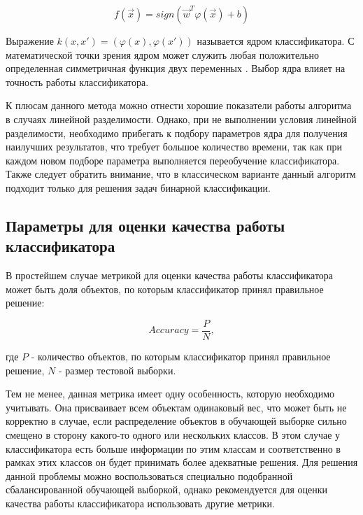 \begin{equation}
f(\vec x) = sign(\vec w^T \varphi(\vec x) + b)
\end{equation}

Выражение $k(x, x') = (\varphi(x),\varphi(x'))$ называется ядром классификатора. С математической точки зрения ядром может служить любая положительно определенная симметричная функция двух переменных \cite{Vorontsov-lections}.
Выбор ядра влияет на точность работы классификатора.

К плюсам данного метода можно отнести хорошие показатели работы алгоритма в случаях линейной разделимости. Однако, при не выполнении условия линейной разделимости, необходимо прибегать к подбору параметров ядра для получения наилучших результатов, что требует большое количество времени, так как при каждом новом подборе параметра выполняется переобучение классификатора. Также следует обратить внимание, что в классическом варианте данный алгоритм подходит только для решения задач бинарной классификации.


\subsection{Параметры для оценки качества работы классификатора}

В простейшем случае метрикой для оценки качества работы классификатора может быть доля объектов, по которым классификатор принял правильное решение:

\begin{equation}
Accuracy = \frac{P}{N},  
\end{equation}

\vspace{\baselineskip}
где $P$ - количество объектов, по которым классификатор принял правильное решение, $N$ - размер тестовой выборки.

Тем не менее, данная метрика имеет одну особенность, которую необходимо учитывать. Она присваивает всем объектам одинаковый вес, что может быть не корректно в случае, если распределение объектов в обучающей выборке сильно смещено в сторону какого-то одного или нескольких классов. В этом случае у классификатора есть больше информации по этим классам и соответственно в рамках этих классов он будет принимать более адекватные решения. Для решения данной проблемы можно воспользоваться специально подобранной сбалансированной обучающей выборкой, однако рекомендуется для оценки качества работы классификатора использовать другие метрики.

